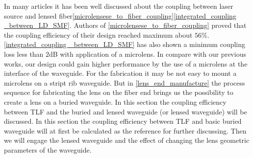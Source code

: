 In many articles it has been well discussed about the coupling between laser source and lensed fiber\ref{microlensese_to_fiber_coupling}\ref{integrated_coupling _between_LD_SMF}. Authors of \ref{microlensese_to_fiber_coupling}  proved that  the coupling efficiency of their design reached maximum about $56\%$. \ref{integrated_coupling _between_LD_SMF} has also shown a minimum coupling loss less than $2$dB with application of a microlens. In compare with our previous works, our design could gain higher performance by the use of a microlens at the interface of the waveguide. For the fabrication it may be not easy to mount a microlens on a stript rib waveguide. But in \ref{lens_end_manufacture} the process sequence for fabricating the lens on the fiber end brings us the possibility to create a lens on a buried waveguide. In this section the coupling efficiency between TLF and the buried and lensed waveguide (or lensed waveguide) will be discussed. In this section the coupling efficiency between TLF and basic buried waveguide will at first be calculated as the reference for further discussing. Then we will engage the lensed waveguide and the effect of changing the lens geometric parameters of the waveguide. 

